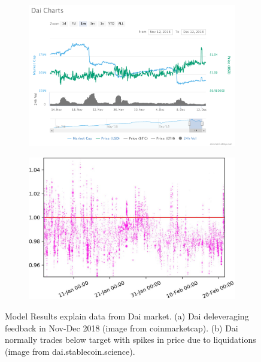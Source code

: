 \begin{figure}
	\centering
	\begin{subfigure}[b]{0.49\textwidth}
		\includegraphics[width=\textwidth]{figures/dai_chart}
		\caption{}\label{fig:dai_chart}
	\end{subfigure}
	\begin{subfigure}[b]{0.49\textwidth}
		\includegraphics[width=\textwidth]{figures/dai_below_target}
		\caption{}\label{fig:dai_below_target}
	\end{subfigure}
	\caption{Model Results explain data from Dai market. (a) Dai deleveraging feedback in Nov-Dec 2018 (image from coinmarketcap). (b) Dai normally trades below target with spikes in price due to liquidations (image from dai.stablecoin.science).}\label{fig:real_liquidity}
\end{figure}

